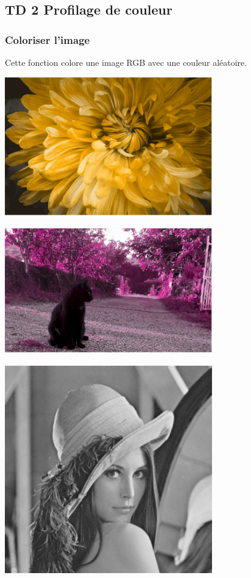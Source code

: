 \documentclass{article}
\begin{document}
\newpage
\subsection{TD 2 Profilage de couleur}

\subsubsection{Coloriser l'image}

Cette fonction colore une image RGB avec une couleur aléatoire.

\begin{center} 
    \includegraphics[width=9cm]{../Image_fonctions/Multicolor/Random.PNG}
\end{center}
\begin{center} 
    \includegraphics[width=9cm]{../Image_fonctions/Cat/Random.PNG}
\end{center}
\begin{center} 
    \includegraphics[width=9cm]{../Image_fonctions/Lenna/Random.PNG}
\end{center}
\end{document}
